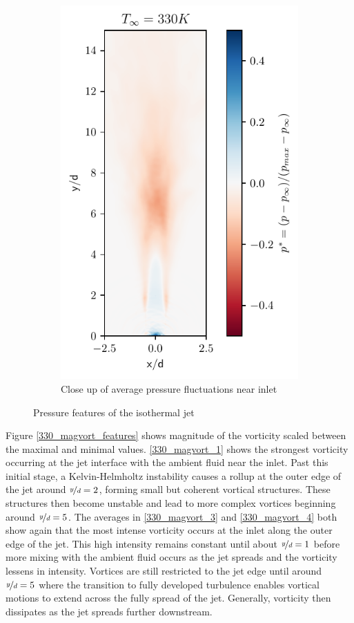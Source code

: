 \begin{figure}[htbp!]
\begin{subfigure}{0.25\textwidth}
	\includegraphics[scale=.65]{figures/Plots/vertical/330/pressure_scaled_vert_avg_330_zoom.pdf}
	\caption{Close up of average pressure fluctuations near inlet} \label{330_pressure_4}
\end{subfigure}
\caption{Pressure features of the isothermal jet}
\label{330_pressure_features}
\end{figure}

Figure \ref{330_magvort_features} shows magnitude of the vorticity scaled between the maximal and minimal values. \ref{330_magvort_1} shows the strongest vorticity occurring at the jet interface with the ambient fluid near the inlet. Past this initial stage, a Kelvin-Helmholtz instability causes a rollup at the outer edge of the jet around $\nicefrac{y}{d} = 2$, forming small but coherent vortical structures. These structures then become unstable and lead to more complex vortices beginning around $\nicefrac{y}{d}= 5$. The averages in \ref{330_magvort_3} and \ref{330_magvort_4} both show again that the most intense vorticity occurs at the inlet along the outer edge of the jet. This high intensity remains constant until about $\nicefrac{y}{d}=1$ before more mixing with the ambient fluid occurs as the jet spreads and the vorticity lessens in intensity. Vortices are still restricted to the jet edge until around $\nicefrac{y}{d} = 5$ where the transition to fully developed turbulence enables vortical motions to extend across the fully spread of the jet. Generally, vorticity then dissipates as the jet spreads further downstream.

